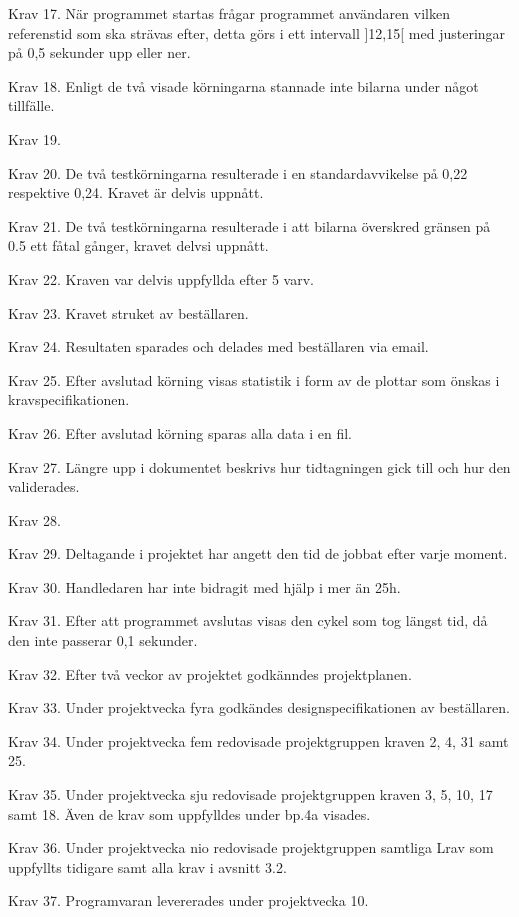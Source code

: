 \documentclass[10pt,oneside,swedish]{lips-no_customer}
\begin{document}
Krav 17. När programmet startas frågar programmet användaren vilken referenstid
som ska strävas efter, detta görs i ett intervall ]12,15[ med justeringar på 0,5
sekunder upp eller ner. 

Krav 18. Enligt de två visade körningarna stannade inte bilarna under något
tillfälle. 

Krav 19. 

Krav 20. De två testkörningarna resulterade i en standardavvikelse på 0,22
respektive 0,24. Kravet är delvis uppnått. 

Krav 21. De två testkörningarna resulterade i att bilarna överskred gränsen på
0.5 ett fåtal gånger, kravet delvsi uppnått. 

Krav 22. Kraven var delvis uppfyllda efter 5 varv. 

Krav 23. Kravet struket av beställaren. 

Krav 24. Resultaten sparades och delades med beställaren via email.  

Krav 25. Efter avslutad körning visas statistik i form av de plottar som önskas
i kravspecifikationen. 

Krav 26. Efter avslutad körning sparas alla data i en fil.  

Krav 27. Längre upp i dokumentet beskrivs hur tidtagningen gick till och hur den
validerades.

Krav 28. 

Krav 29. Deltagande i projektet har angett den tid de jobbat efter varje moment. 

Krav 30. Handledaren har inte bidragit med hjälp i mer än 25h.

Krav 31. Efter att programmet avslutas visas den cykel som tog längst tid, då
den inte passerar 0,1 sekunder. 

Krav 32. Efter två veckor av projektet godkänndes projektplanen. 

Krav 33. Under projektvecka fyra godkändes designspecifikationen av beställaren. 

Krav 34. Under projektvecka fem redovisade projektgruppen kraven 2, 4, 31 samt 25. 

Krav 35. Under projektvecka sju redovisade projektgruppen kraven 3, 5, 10, 17
samt 18. Även de krav som uppfylldes under bp.4a visades. 

Krav 36. Under projektvecka nio redovisade projektgruppen samtliga Lrav som
uppfyllts tidigare samt alla krav i avsnitt 3.2.

Krav 37. Programvaran levererades under projektvecka 10. 
\end{document}
